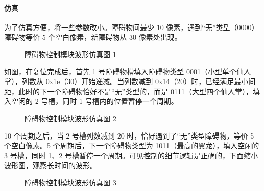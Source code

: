 \documentclass[hyperref,UTF8,12pt,a4paper]{ctexart}
\begin{document}
\hypertarget{ux4effux771f-1}{%
\paragraph{仿真}\label{ux4effux771f-1}}

为了仿真方便，将一些参数改小。障碍物间最少 10
像素，遇到``无''类型（0000）障碍物等价 5 个空白像素，新障碍物从 30
像素处出现。

\begin{figure}[H]
\centering
{}
\caption{障碍物控制模块波形仿真图 1}
\end{figure}

如图，在复位完成后，首先 1 号障碍物槽填入障碍物类型
0001（小型单个仙人掌），列数从 0x1e（30）开始递减。当列数减到
0x14（20）时，已经满足最小间距，此时的下一个障碍物恰好不是``无''类型的，而是
0111（大型四个仙人掌），填入空闲的 2 号槽，同时 1
号槽内的位置暂停一个周期。

\begin{figure}[H]
\centering
{}
\caption{障碍物控制模块波形仿真图 2}
\end{figure}

10 个周期之后，当 2 号槽列数减到 20 时，恰好遇到了``无''类型障碍物，等价
5 个空白像素。5 个周期后，下一个障碍物类型为
1011（最高的翼龙），填入空闲的 3 号槽，同时 1、2
号槽暂停一个周期。可见控制的细节逻辑是正确的，下面缩小波形图，观察长时间的波形。

\begin{figure}[H]
\centering
{}
\caption{障碍物控制模块波形仿真图 3}
\end{figure}
\end{document}
